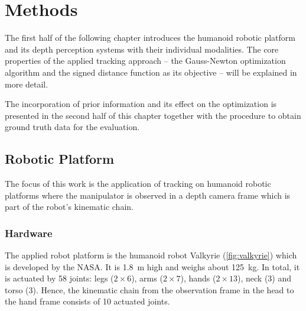 \chapter{Methods}
\label{sec:methods}

The first half of the following chapter introduces the humanoid robotic platform and its depth perception systems with their individual modalities. The core properties of the applied tracking approach -- the Gauss-Newton optimization algorithm and the signed distance function as its objective -- will be explained in more detail.

The incorporation of prior information and its effect on the optimization is presented in the second half of this chapter together with the procedure to obtain ground truth data for the evaluation.

\section{Robotic Platform}

The focus of this work is the application of tracking on humanoid robotic platforms where the manipulator is observed in a depth camera frame which is part of the robot's kinematic chain.

\subsection{Hardware}

The applied robot platform is the humanoid robot Valkyrie (\cref{fig:valkyrie}) which is developed by the NASA. It is \SI{1.8}{\meter} high and weighs about \SI{125}{\kilo\gram}. In total, it is actuated by 58 joints: legs ($2 \times 6$), arms ($2 \times 7$), hands ($2 \times 13$), neck (3) and torso (3). Hence, the kinematic chain from the observation frame in the head to the hand frame consists of 10 actuated joints.

